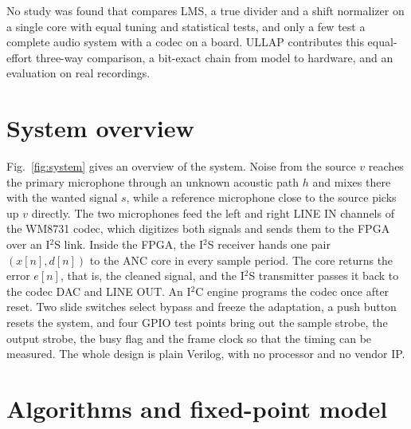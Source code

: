 No study was found that compares LMS, a true divider and a shift normalizer on a single core with equal
tuning and statistical tests, and only a few test a complete audio system with a codec on a board. ULLAP
contributes this equal-effort three-way comparison, a bit-exact chain from model to hardware, and an
evaluation on real recordings.

\section{System overview}\label{sec:system}
Fig.~\ref{fig:system} gives an overview of the system. Noise from the source $v$ reaches the primary
microphone through an unknown acoustic path $h$ and mixes there with the wanted signal $s$, while a
reference microphone close to the source picks up $v$ directly. The two microphones feed the left and
right LINE IN channels of the WM8731 codec, which digitizes both signals and sends them to the FPGA over
an I$^2$S link. Inside the FPGA, the I$^2$S receiver hands one pair $(x[n],d[n])$ to the ANC core in every
sample period. The core returns the error $e[n]$, that is, the cleaned signal, and the I$^2$S transmitter
passes it back to the codec DAC and LINE OUT. An I$^2$C engine programs the codec once after reset. Two
slide switches select bypass and freeze the adaptation, a push button resets the system, and four GPIO
test points bring out the sample strobe, the output strobe, the busy flag and the frame clock so that the
timing can be measured. The whole design is plain Verilog, with no processor and no vendor IP.

\begin{\WF}[!htbp]\centering
{}
\caption{Block diagram of the ULLAP system. In the experiments the acoustic part (upper left) is
simulated (Section~\ref{sec:setup}); everything from the codec onwards runs on the DE2-115 board.}\label{fig:system}
\end{\WF}

\section{Algorithms and fixed-point model}\label{sec:model}
